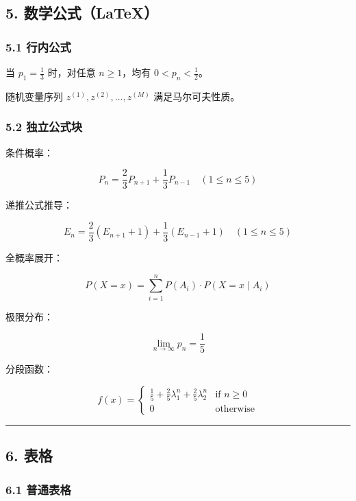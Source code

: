 \documentclass[]{article}
\begin{document}
\subsection{5. 数学公式（LaTeX）}\label{ux6570ux5b66ux516cux5f0flatex}

\subsubsection{5.1 行内公式}\label{ux884cux5185ux516cux5f0f}

当 \(p_1 = \frac{1}{3}\) 时，对任意 \(n \ge 1\)，均有
\(0 < p_n < \frac{1}{2}\)。

随机变量序列 \(z^{(1)}, z^{(2)}, \dots, z^{(M)}\) 满足马尔可夫性质。

\subsubsection{5.2 独立公式块}\label{ux72ecux7acbux516cux5f0fux5757}

条件概率：

\[P_n = \frac{2}{3} P_{n+1} + \frac{1}{3} P_{n-1} \quad (1 \le n \le 5)\]

递推公式推导：

\[E_n = \frac{2}{3} (E_{n+1} + 1) + \frac{1}{3} (E_{n-1} + 1) \quad (1 \le n \le 5)\]

全概率展开：

\[P(X = x) = \sum_{i=1}^{n} P(A_i) \cdot P(X = x \mid A_i)\]

极限分布：

\[\lim_{n \to \infty} p_n = \frac{1}{5}\]

分段函数：

\[
f(x) = 
\begin{cases}
\frac{1}{5} + \frac{2}{5}\lambda_1^n + \frac{2}{5}\lambda_2^n & \text{if } n \ge 0 \\
0 & \text{otherwise}
\end{cases}
\]

\begin{center}\rule{0.5\linewidth}{0.5pt}\end{center}

\subsection{6. 表格}\label{ux8868ux683c}

\subsubsection{6.1 普通表格}\label{ux666eux901aux8868ux683c}
\end{document}
